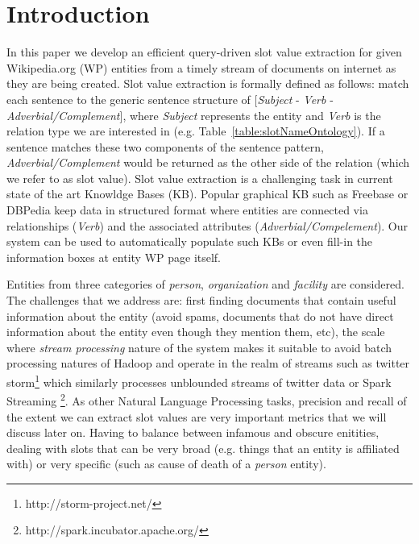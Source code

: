 
\section{Introduction}


In this paper we develop an efficient query-driven slot value extraction for given Wikipedia.org (WP) entities from a timely stream of documents on internet as they are being created. Slot value extraction is formally defined as follows: match each sentence to the generic sentence structure of [\textit{Subject} - \textit{Verb} - \textit{Adverbial/Complement}]\cite{sentencePatterns08}, where  \textit{Subject} represents the entity and \textit{Verb} is the relation type we are interested in (e.g. Table~\ref{table:slotNameOntology}). If a sentence matches these two components of the sentence pattern, \textit{Adverbial/Complement} would be returned as the other side of the relation (which we refer to as slot value). Slot value extraction is a challenging task in current state of the art Knowldge Bases (KB). Popular graphical KB such as Freebase or DBPedia keep data in structured format where entities are connected via relationships (\textit{Verb}) and the associated attributes (\textit{Adverbial/Compelement}). Our system can be used to automatically populate such KBs or even fill-in the information boxes at entity WP page itself.

Entities from three categories of \textit{person}, \textit{organization} and \textit{facility} are considered. The challenges that we address are: first finding documents that contain useful information about the entity (avoid spams, documents that do not have direct information about the entity even though they mention them, etc), the scale where \textit{stream processing} nature of the system makes it suitable to avoid batch processing natures of Hadoop and operate in the realm of streams such as twitter storm\footnote{http://storm-project.net/} which similarly processes unblounded streams of twitter data or Spark Streaming \footnote{http://spark.incubator.apache.org/}. As other Natural Language Processing tasks, precision and recall of the extent we can extract slot values are very important metrics that we will discuss later on. Having to balance between infamous and obscure enitities, dealing with slots that can be very broad (e.g. things that an entity is affiliated with) or very specific (such as cause of death of a \textit{person} entity).

